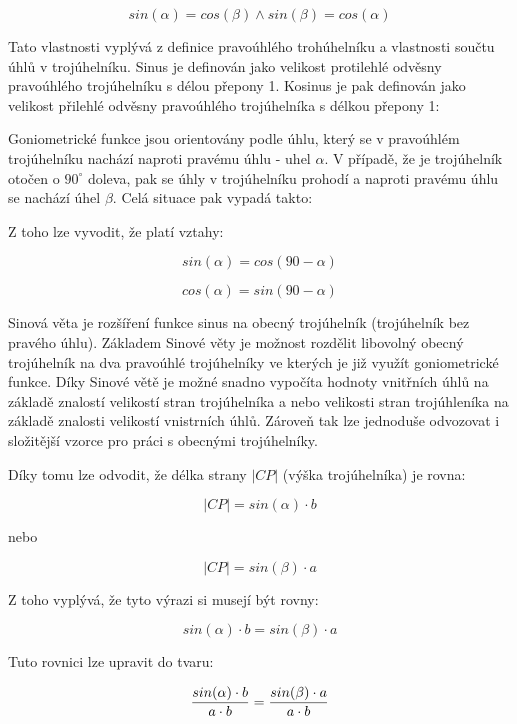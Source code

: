 $$ sin(\alpha) = cos(\beta) \wedge sin(\beta) = cos (\alpha)$$

Tato vlastnosti vyplývá z definice pravoúhlého trohúhelníku a vlastnosti součtu úhlů v trojúhelníku. Sinus je definován jako velikost protilehlé odvěsny pravoúhlého trojúhelníku s délou přepony 1. Kosinus je pak definován jako velikost přilehlé odvěsny pravoúhlého trojúhelníka s délkou přepony 1:

\vskip 4mm
\centerline{}
\vskip 4mm


Goniometrické funkce jsou orientovány podle úhlu, který se v pravoúhlém trojúhelníku nachází naproti pravému úhlu - uhel $\alpha$. V případě, že je trojúhelník otočen o $90^\circ$ doleva, pak se úhly v trojúhelníku prohodí a naproti pravému úhlu se nachází úhel $\beta$.  Celá situace pak vypadá takto:

\vskip 4mm
\centerline{}
\vskip 4mm

Z toho lze vyvodit, že platí vztahy:

$$ sin(\alpha) = cos(90-\alpha) $$

$$ cos (\alpha) = sin(90-\alpha)$$


Sinová věta je rozšíření funkce sinus na obecný trojúhelník (trojúhelník bez pravého úhlu). Základem Sinové věty je možnost rozdělit libovolný obecný trojúhelník na dva pravoúhlé trojúhelníky ve kterých je již využít goniometrické funkce. Díky Sinové větě je možné snadno vypočíta hodnoty vnitřních úhlů na základě znalostí velikostí stran trojúhelníka a nebo velikosti stran trojúhleníka na základě znalosti velikostí vnistrních úhlů. Zároveň tak lze jednoduše odvozovat i složitější vzorce pro práci s obecnými trojúhelníky.

\vskip 4mm
\centerline{}
\vskip 4mm

Díky tomu lze odvodit, že délka strany $|CP|$ (výška trojúhelníka) je rovna:

$$ |CP| = sin(\alpha)\cdot b $$

nebo

$$ |CP| = sin(\beta)\cdot a $$

Z toho vyplývá, že tyto výrazi si musejí být rovny:

$$ sin(\alpha)\cdot b = sin(\beta)\cdot a $$

Tuto rovnici lze upravit do tvaru:

$$ {sin(\alpha)\cdot b \over a\cdot b} = {sin(\beta)\cdot a \over a\cdot b}$$


